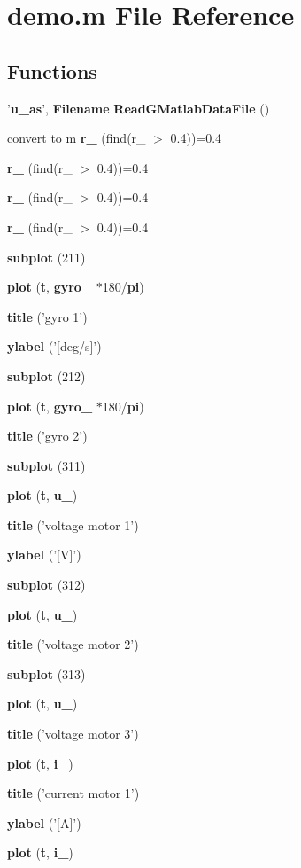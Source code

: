 \section{demo.m File Reference}
\label{matlabdatafiles_2identification__mode_2demo_8m}
\subsection*{Functions}
\begin{DoxyCompactItemize}
\item 
'{\bf u\_\-as}', {\bf Filename} {\bf ReadGMatlabDataFile} ()
\item 
convert to m {\bf r\_} (find(r\_ $>$ 0.4))=0.4
\item 
{\bf r\_} (find(r\_ $>$ 0.4))=0.4
\item 
{\bf r\_} (find(r\_ $>$ 0.4))=0.4
\item 
{\bf r\_} (find(r\_ $>$ 0.4))=0.4
\item 
{\bf subplot} (211)
\item 
{\bf plot} ({\bf t}, {\bf gyro\_} $\ast$180/{\bf pi})
\item 
{\bf title} ('gyro 1')
\item 
{\bf ylabel} ('[deg/s]')
\item 
{\bf subplot} (212)
\item 
{\bf plot} ({\bf t}, {\bf gyro\_} $\ast$180/{\bf pi})
\item 
{\bf title} ('gyro 2')
\item 
{\bf subplot} (311)
\item 
{\bf plot} ({\bf t}, {\bf u\_})
\item 
{\bf title} ('voltage motor 1')
\item 
{\bf ylabel} ('[V]')
\item 
{\bf subplot} (312)
\item 
{\bf plot} ({\bf t}, {\bf u\_})
\item 
{\bf title} ('voltage motor 2')
\item 
{\bf subplot} (313)
\item 
{\bf plot} ({\bf t}, {\bf u\_})
\item 
{\bf title} ('voltage motor 3')
\item 
{\bf plot} ({\bf t}, {\bf i\_})
\item 
{\bf title} ('current motor 1')
\item 
{\bf ylabel} ('[A]')
\item 
{\bf plot} ({\bf t}, {\bf i\_})

\end{DoxyCompactItemize}
